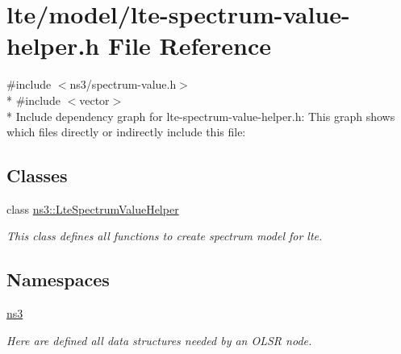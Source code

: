 \hypertarget{lte-spectrum-value-helper_8h}{}\section{lte/model/lte-\/spectrum-\/value-\/helper.h File Reference}
\label{lte-spectrum-value-helper_8h}
{\ttfamily \#include $<$ns3/spectrum-\/value.\+h$>$}\\*
{\ttfamily \#include $<$vector$>$}\\*
Include dependency graph for lte-\/spectrum-\/value-\/helper.h\+:
This graph shows which files directly or indirectly include this file\+:
\subsection*{Classes}
\begin{DoxyCompactItemize}
\item 
class \hyperlink{classns3_1_1LteSpectrumValueHelper}{ns3\+::\+Lte\+Spectrum\+Value\+Helper}
\begin{DoxyCompactList}\small\item\em This class defines all functions to create spectrum model for lte. \end{DoxyCompactList}\end{DoxyCompactItemize}
\subsection*{Namespaces}
\begin{DoxyCompactItemize}
\item 
 \hyperlink{namespacens3}{ns3}
\begin{DoxyCompactList}\small\item\em Here are defined all data structures needed by an O\+L\+SR node. \end{DoxyCompactList}\end{DoxyCompactItemize}
